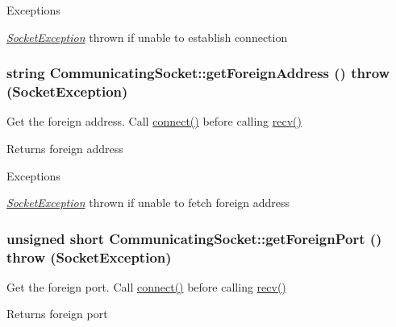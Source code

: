 \begin{DoxyExceptions}{Exceptions}
\item[{\em \hyperlink{classSocketException}{SocketException}}]thrown if unable to establish connection \end{DoxyExceptions}
\hypertarget{classCommunicatingSocket_a13f9eca30ef56836cf23c163c848c09e}{
\subsubsection[{getForeignAddress}]{\setlength{\rightskip}{0pt plus 5cm}string CommunicatingSocket::getForeignAddress ()  throw ({\bf SocketException})}}
\label{classCommunicatingSocket_a13f9eca30ef56836cf23c163c848c09e}
Get the foreign address. Call \hyperlink{classCommunicatingSocket_a9192374d9baab8e189860aa8d913683c}{connect()} before calling \hyperlink{classCommunicatingSocket_a7cf1fd470c0060171b68df9f68c7bd01}{recv()} \begin{DoxyReturn}{Returns}
foreign address 
\end{DoxyReturn}

\begin{DoxyExceptions}{Exceptions}
\item[{\em \hyperlink{classSocketException}{SocketException}}]thrown if unable to fetch foreign address \end{DoxyExceptions}
\hypertarget{classCommunicatingSocket_a184fbb4775184b87ebd886a5587eb1a3}{
\subsubsection[{getForeignPort}]{\setlength{\rightskip}{0pt plus 5cm}unsigned short CommunicatingSocket::getForeignPort ()  throw ({\bf SocketException})}}
\label{classCommunicatingSocket_a184fbb4775184b87ebd886a5587eb1a3}
Get the foreign port. Call \hyperlink{classCommunicatingSocket_a9192374d9baab8e189860aa8d913683c}{connect()} before calling \hyperlink{classCommunicatingSocket_a7cf1fd470c0060171b68df9f68c7bd01}{recv()} \begin{DoxyReturn}{Returns}
foreign port 
\end{DoxyReturn}

